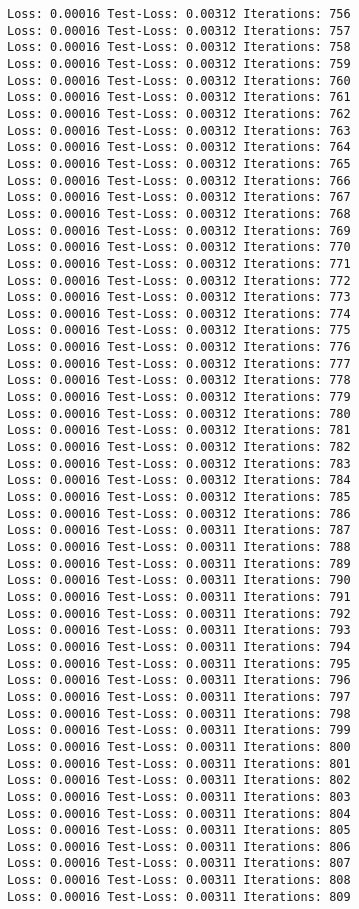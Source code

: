 \documentclass[11pt]{article}
\begin{document}
\begin{Verbatim}[commandchars=\\\{\}]
Loss: 0.00016 Test-Loss: 0.00312 Iterations: 756
Loss: 0.00016 Test-Loss: 0.00312 Iterations: 757
Loss: 0.00016 Test-Loss: 0.00312 Iterations: 758
Loss: 0.00016 Test-Loss: 0.00312 Iterations: 759
Loss: 0.00016 Test-Loss: 0.00312 Iterations: 760
Loss: 0.00016 Test-Loss: 0.00312 Iterations: 761
Loss: 0.00016 Test-Loss: 0.00312 Iterations: 762
Loss: 0.00016 Test-Loss: 0.00312 Iterations: 763
Loss: 0.00016 Test-Loss: 0.00312 Iterations: 764
Loss: 0.00016 Test-Loss: 0.00312 Iterations: 765
Loss: 0.00016 Test-Loss: 0.00312 Iterations: 766
Loss: 0.00016 Test-Loss: 0.00312 Iterations: 767
Loss: 0.00016 Test-Loss: 0.00312 Iterations: 768
Loss: 0.00016 Test-Loss: 0.00312 Iterations: 769
Loss: 0.00016 Test-Loss: 0.00312 Iterations: 770
Loss: 0.00016 Test-Loss: 0.00312 Iterations: 771
Loss: 0.00016 Test-Loss: 0.00312 Iterations: 772
Loss: 0.00016 Test-Loss: 0.00312 Iterations: 773
Loss: 0.00016 Test-Loss: 0.00312 Iterations: 774
Loss: 0.00016 Test-Loss: 0.00312 Iterations: 775
Loss: 0.00016 Test-Loss: 0.00312 Iterations: 776
Loss: 0.00016 Test-Loss: 0.00312 Iterations: 777
Loss: 0.00016 Test-Loss: 0.00312 Iterations: 778
Loss: 0.00016 Test-Loss: 0.00312 Iterations: 779
Loss: 0.00016 Test-Loss: 0.00312 Iterations: 780
Loss: 0.00016 Test-Loss: 0.00312 Iterations: 781
Loss: 0.00016 Test-Loss: 0.00312 Iterations: 782
Loss: 0.00016 Test-Loss: 0.00312 Iterations: 783
Loss: 0.00016 Test-Loss: 0.00312 Iterations: 784
Loss: 0.00016 Test-Loss: 0.00312 Iterations: 785
Loss: 0.00016 Test-Loss: 0.00312 Iterations: 786
Loss: 0.00016 Test-Loss: 0.00311 Iterations: 787
Loss: 0.00016 Test-Loss: 0.00311 Iterations: 788
Loss: 0.00016 Test-Loss: 0.00311 Iterations: 789
Loss: 0.00016 Test-Loss: 0.00311 Iterations: 790
Loss: 0.00016 Test-Loss: 0.00311 Iterations: 791
Loss: 0.00016 Test-Loss: 0.00311 Iterations: 792
Loss: 0.00016 Test-Loss: 0.00311 Iterations: 793
Loss: 0.00016 Test-Loss: 0.00311 Iterations: 794
Loss: 0.00016 Test-Loss: 0.00311 Iterations: 795
Loss: 0.00016 Test-Loss: 0.00311 Iterations: 796
Loss: 0.00016 Test-Loss: 0.00311 Iterations: 797
Loss: 0.00016 Test-Loss: 0.00311 Iterations: 798
Loss: 0.00016 Test-Loss: 0.00311 Iterations: 799
Loss: 0.00016 Test-Loss: 0.00311 Iterations: 800
Loss: 0.00016 Test-Loss: 0.00311 Iterations: 801
Loss: 0.00016 Test-Loss: 0.00311 Iterations: 802
Loss: 0.00016 Test-Loss: 0.00311 Iterations: 803
Loss: 0.00016 Test-Loss: 0.00311 Iterations: 804
Loss: 0.00016 Test-Loss: 0.00311 Iterations: 805
Loss: 0.00016 Test-Loss: 0.00311 Iterations: 806
Loss: 0.00016 Test-Loss: 0.00311 Iterations: 807
Loss: 0.00016 Test-Loss: 0.00311 Iterations: 808
Loss: 0.00016 Test-Loss: 0.00311 Iterations: 809

\end{Verbatim}
\end{document}
